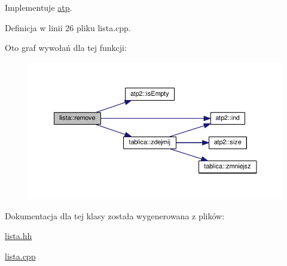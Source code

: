 Implementuje \hyperlink{classatp_a8294b0364a83890f88ef798b11473f7e}{atp}.



Definicja w linii 26 pliku lista.\+cpp.



Oto graf wywołań dla tej funkcji\+:\nopagebreak
\begin{figure}[H]
\begin{center}
\leavevmode
\includegraphics[width=350pt]{classlista_af1900e0adeee6f2bf55c3b01c94b5e42_cgraph}
\end{center}
\end{figure}




Dokumentacja dla tej klasy została wygenerowana z plików\+:\begin{DoxyCompactItemize}
\item 
\hyperlink{lista_8hh}{lista.\+hh}\item 
\hyperlink{lista_8cpp}{lista.\+cpp}\end{DoxyCompactItemize}
